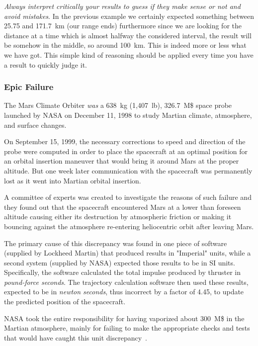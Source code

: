 \emph{Always interpret critically your results to guess if they make sense or not and avoid mistakes}. In the previous example we certainly expected something between 25.75 and 171.7~km (our range ends) furthermore since we are looking for the distance at a time which is almost halfway the considered interval, the result will be somehow in the middle, so around 100~km. This is indeed more or less what we have got. This simple kind of reasoning should be applied every time you have a result to quickly judge it.

\begin{curiosity}
\subsubsection{Epic Failure}
The Mars Climate Orbiter \emph{was} a 638~kg (1,407~lb), 326.7~M\$ space probe launched by NASA on December 11, 1998 to study Martian climate, atmosphere, and surface changes. 

On September 15, 1999, the necessary corrections to speed and direction of the probe were computed in order to place the spacecraft at an optimal position for an orbital insertion maneuver that would bring it around Mars at the proper altitude. 
But one week later communication with the spacecraft was permanently lost as it went into Martian orbital insertion. 

A committee of experts was created to investigate the reasons of 
such failure and they found out that the spacecraft encountered Mars at a lower than foreseen altitude causing either its destruction by atmospheric friction or making it bouncing against the atmosphere re-entering heliocentric orbit after leaving Mars.

The primary cause of this discrepancy was found in one piece of software (supplied by Lockheed Martin) that produced results in "Imperial" units,  while a second system (supplied by NASA) expected those results to be in SI units. Specifically, the software calculated the total impulse produced by thruster in \emph{pound-force seconds}. The trajectory calculation software then used these results, expected to be in \emph{newton seconds}, thus incorrect by a factor of 4.45, to update the predicted position of the spacecraft.
	
NASA took the entire responsibility for having vaporized about 300~M\$ in the Martian atmosphere, mainly for failing to make the appropriate checks and tests that would have caught this unit discrepancy~\cite{bib:mars}.	
\end{curiosity}

